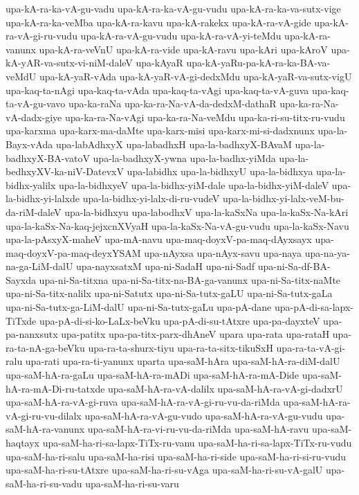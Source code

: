 {upa-kA-ra-ka-vA-gu-vadu
upa-kA-ra-ka-vA-gu-vudu
upa-kA-ra-ka-va-sutx-vige
upa-kA-ra-ka-veMba
upa-kA-ra-kavu
upa-kA-rakekx
upa-kA-ra-vA-gide
upa-kA-ra-vA-gi-ru-vudu
upa-kA-ra-vA-gu-vudu
upa-kA-ra-vA-yi-teMdu
upa-kA-ra-vanunx
upa-kA-ra-veVnU
upa-kA-ra-vide
upa-kA-ravu
upa-kAri
upa-kAroV
upa-kA-yAR-va-sutx-vi-niM-daleV
upa-kAyaR
upa-kA-yaRu-pa-kA-ra-ka-BA-va-veMdU
upa-kA-yaR-vAda
upa-kA-yaR-vA-gi-dedxMdu
upa-kA-yaR-va-sutx-vigU
upa-kaq-ta-nAgi
upa-kaq-ta-vAda
upa-kaq-ta-vAgi
upa-kaq-ta-vA-guva
upa-kaq-ta-vA-gu-vavo
upa-ka-raNa
upa-ka-ra-Na-vA-da-dedxM-dathaR
upa-ka-ra-Na-vA-dadx-giye
upa-ka-ra-Na-vAgi
upa-ka-ra-Na-veMdu
upa-ka-ri-su-titx-ru-vudu
upa-karxma
upa-karx-ma-daMte
upa-karx-misi
upa-karx-mi-si-dadxnunx
upa-la-Bayx-vAda
upa-labAdhxyX
upa-labadhxH
upa-la-badhxyX-BAvaM
upa-la-badhxyX-BA-vatoV
upa-la-badhxyX-ywna
upa-la-badhx-yiMda
upa-la-bedhxyXV-ka-niV-DatevxV
upa-labidhx
upa-la-bidhxyU
upa-la-bidhxya
upa-la-bidhx-yalilx
upa-la-bidhxyeV
upa-la-bidhx-yiM-dale
upa-la-bidhx-yiM-daleV
upa-la-bidhx-yi-lalxde
upa-la-bidhx-yi-lalx-di-ru-vudeV
upa-la-bidhx-yi-lalx-veM-bu-da-riM-daleV
upa-la-bidhxyu
upa-labodhxV
upa-la-kaSxNa
upa-la-kaSx-Na-kAri
upa-la-kaSx-Na-kaq-jejxcnXVyaH
upa-la-kaSx-Na-vA-gu-vudu
upa-la-kaSx-Navu
upa-la-pAsxyX-maheV
upa-mA-navu
upa-maq-doyxV-pa-maq-dAyxsayx
upa-maq-doyxV-pa-maq-deyxYSAM
upa-nAyxsa
upa-nAyx-savu
upa-naya
upa-na-ya-na-ga-LiM-dalU
upa-nayxsatxM
upa-ni-SadaH
upa-ni-Sadf
upa-ni-Sa-df-BA-Sayxda
upa-ni-Sa-titxna
upa-ni-Sa-titx-na-BA-ga-vanunx
upa-ni-Sa-titx-naMte
upa-ni-Sa-titx-nalilx
upa-ni-Satutx
upa-ni-Sa-tutx-gaLU
upa-ni-Sa-tutx-gaLa
upa-ni-Sa-tutx-ga-LiM-dalU
upa-ni-Sa-tutx-gaLu
upa-pA-dane
upa-pA-di-sa-lapx-TiTxde
upa-pA-di-si-ko-LaLx-beVku
upa-pA-di-su-tAtxre
upa-pa-dayxteV
upa-pa-nanxsutx
upa-patitx
upa-pa-titx-parx-dhAneV
upara
upa-rata
upa-rataH
upa-ra-ta-nA-ga-beVku
upa-ra-ta-shurx-tiyu
upa-ra-ta-sitx-tikuSxH
upa-ra-ta-vA-gi-ralu
upa-rati
upa-ra-ti-yanunx
uparta
upa-saM-hAra
upa-saM-hA-ra-diM-dalU
upa-saM-hA-ra-gaLu
upa-saM-hA-ra-mADi
upa-saM-hA-ra-mA-Dide
upa-saM-hA-ra-mA-Di-ru-tatxde
upa-saM-hA-ra-vA-dalilx
upa-saM-hA-ra-vA-gi-dadxrU
upa-saM-hA-ra-vA-gi-ruva
upa-saM-hA-ra-vA-gi-ru-vu-da-riMda
upa-saM-hA-ra-vA-gi-ru-vu-dilalx
upa-saM-hA-ra-vA-gu-vudo
upa-saM-hA-ra-vA-gu-vudu
upa-saM-hA-ra-vanunx
upa-saM-hA-ra-vi-ru-vu-da-riMda
upa-saM-hA-ravu
upa-saM-haqtayx
upa-saM-ha-ri-sa-lapx-TiTx-ru-vanu
upa-saM-ha-ri-sa-lapx-TiTx-ru-vudu
upa-saM-ha-ri-salu
upa-saM-ha-risi
upa-saM-ha-ri-side
upa-saM-ha-ri-si-ru-vudu
upa-saM-ha-ri-su-tAtxre
upa-saM-ha-ri-su-vAga
upa-saM-ha-ri-su-vA-galU
upa-saM-ha-ri-su-vadu
upa-saM-ha-ri-su-varu
}
